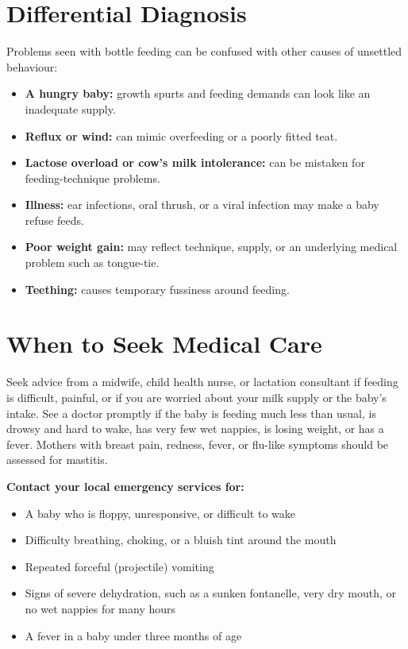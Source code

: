 \section*{Differential Diagnosis}
Problems seen with bottle feeding can be confused with other causes of unsettled behaviour:
\begin{itemize}
    \item \textbf{A hungry baby:} growth spurts and feeding demands can look like an inadequate supply.
    \item \textbf{Reflux or wind:} can mimic overfeeding or a poorly fitted teat.
    \item \textbf{Lactose overload or cow's milk intolerance:} can be mistaken for feeding-technique problems.
    \item \textbf{Illness:} ear infections, oral thrush, or a viral infection may make a baby refuse feeds.
    \item \textbf{Poor weight gain:} may reflect technique, supply, or an underlying medical problem such as tongue-tie.
    \item \textbf{Teething:} causes temporary fussiness around feeding.
\end{itemize}

\section*{When to Seek Medical Care}
Seek advice from a midwife, child health nurse, or lactation consultant if feeding is difficult, painful, or if you are worried about your milk supply or the baby's intake. See a doctor promptly if the baby is feeding much less than usual, is drowsy and hard to wake, has very few wet nappies, is losing weight, or has a fever. Mothers with breast pain, redness, fever, or flu-like symptoms should be assessed for mastitis.

\textbf{Contact your local emergency services for:}
\begin{itemize}
    \item A baby who is floppy, unresponsive, or difficult to wake
    \item Difficulty breathing, choking, or a bluish tint around the mouth
    \item Repeated forceful (projectile) vomiting
    \item Signs of severe dehydration, such as a sunken fontanelle, very dry mouth, or no wet nappies for many hours
    \item A fever in a baby under three months of age
\end{itemize}

